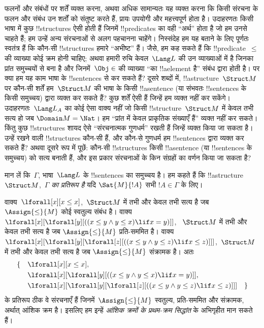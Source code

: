 \documentclass[../../../include/open-logic-section]{subfiles}
\begin{document}


\begin{explain}
फलनों और संबंधों पर शर्तें व्यक्त करना, अथवा अधिक सामान्यतः यह व्यक्त करना कि
किसी संरचना के फलन और संबंध उन शर्तों को संतुष्ट करते हैं, प्रायः उपयोगी और
महत्त्वपूर्ण होता है। उदाहरणतः किसी भाषा में कुछ !!{structure}s ऐसी होती हैं
जिनमें !!{predicate}s का वही ``अर्थ'' होता है जो हम उनसे चाहते हैं; हम उन्हें
अन्य संरचनाओं से अलग पहचानना चाहेंगे। निस्संदेह हम यह बताने के लिए पूर्णतः
स्वतंत्र हैं कि कौन-सी !!{structure}s हमारे ``अभीष्ट'' हैं। जैसे, हम कह सकते
हैं कि !!{predicate}~$\le$ की व्याख्या कोई क्रम होनी चाहिए; अथवा हमारी रुचि
केवल~$\Lang L$ की उन व्याख्याओं में है जिनका प्रांत समुच्चयों से बना है और
जिनमें~$\Obj \in$ की व्याख्या ``का !!a{element} है'' संबंध द्वारा होती है।
पर क्या हम यह काम भाषा के !!{sentence}s से कर सकते हैं? दूसरे शब्दों में,
!!a{structure}~$\Struct M$ पर कौन-सी शर्तें हम~$\Struct M$ की भाषा के किसी
!!a{sentence} (या संभवतः !!{sentence}s के किसी समुच्चय) द्वारा व्यक्त कर सकते
हैं? कुछ शर्तें ऐसी हैं जिन्हें हम व्यक्त नहीं कर सकेंगे। उदाहरणतः~$\Lang L_A$
का कोई ऐसा वाक्य नहीं जो किसी !!{structure}~$\Struct M$ में केवल
तभी सत्य हो जब $\Domain M = \Nat$। हम ``प्रांत में केवल प्राकृतिक संख्याएँ
हैं'' व्यक्त नहीं कर सकते। किंतु कुछ !!{structure}s शायद ऐसे ``संरचनात्मक
गुणधर्म'' रखती हैं जिन्हें व्यक्त किया जा सकता है। उन्हें रखने वाली
!!{structure}s कौन-सी हैं, और कौन-से गुणधर्म हम !!{sentence}s द्वारा व्यक्त कर
सकते हैं? अथवा दूसरे रूप में पूछें: कौन-सी !!{structure}s किसी !!a{sentence}
(या !!{sentence}s के समुच्चय) को सत्य बनाती हैं, और इस प्रकार संरचनाओं के किन
संग्रहों का वर्णन किया जा सकता है?
\end{explain}

\begin{defn}[समुच्चय का प्रतिरूप]
मान लें कि~$\Gamma$, भाषा~$\Lang L$ के !!{sentence}s का समुच्चय है। हम कहते
हैं कि !!a{structure}~$\Struct M$,~$\Gamma$ \emph{का प्रतिरूप है} यदि
$\Sat{M}{!A}$ सभी $!A \in \Gamma$ के लिए।
\end{defn}

\begin{ex}
वाक्य~$\lforall[x][x \le x]$,~$\Struct M$ में तभी और केवल तभी सत्य
है जब $\Assign{\le}{M}$ कोई स्वतुल्य संबंध है। वाक्य
$\lforall[x][\lforall[y][((x \le y \land y \le x) \lif x = y)]]$,
~$\Struct M$ में तभी और केवल तभी सत्य है जब $\Assign{\le}{M}$ प्रति-सममित
है। वाक्य~$\lforall[x][\lforall[y][\lforall[z][((x \le y \land y \le z)
      \lif x \le z)]]]$,~$\Struct M$ में तभी और केवल तभी सत्य है जब
$\Assign{\le}{M}$ संक्रामक है। अतः
\begin{align*}
\{\quad &\lforall[x][x \le x], \\
   & \lforall[x][\lforall[y][((x \le y \land y \le
    x) \lif x = y)]], \\
   &\lforall[x][\lforall[y][\lforall[z][((x \le y
      \land y \le z) \lif x \le z)]]] \quad \}
\end{align*}
के प्रतिरूप ठीक वे संरचनाएँ हैं जिनमें~$\Assign{\le}{M}$ स्वतुल्य,
प्रति-सममित और संक्रामक, अर्थात् आंशिक क्रम है। इसलिए हम इन्हें
\emph{आंशिक क्रमों के प्रथम-क्रम सिद्धांत} के अभिगृहीत मान सकते हैं।
\end{ex}
\end{document}
